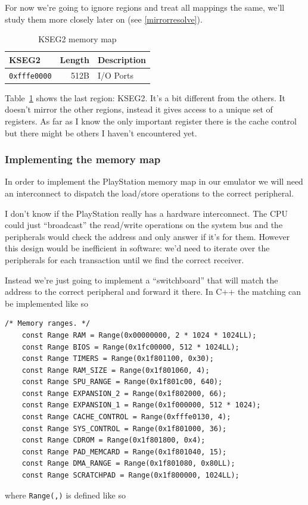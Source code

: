 \documentclass[a4paper]{article}
\newcommand{\code}[1] {\texttt{#1}}
\begin{document}
For now we're going to ignore regions and treat all mappings the same,
we'll study them more closely later on (see \ref{mirrorresolve}).

\begin{table}[ht]
  \centering

  \begin{tabular}{ l | r | l }
    KSEG2 & Length & Description \\
    \hline
    \code{0xfffe0000} & 512B & I/O Ports \\
  \end{tabular}

  \caption{KSEG2 memory map}
  \label{tab:kseg2}
\end{table}

Table~\ref{tab:kseg2} shows the last region: KSEG2. It's a bit
different from the others. It doesn't mirror the other regions,
instead it gives access to a unique set of registers. As far as I know
the only important register there is the cache control but there might
be others I haven't encountered yet.

\subsubsection{Implementing the memory map}

In order to implement the PlayStation memory map in our emulator we
will need an interconnect to dispatch the load/store operations to the
correct peripheral.

I don't know if the PlayStation really has a hardware
interconnect. The CPU could just ``broadcast'' the read/write operations
on the system bus and the peripherals would check the address and only
answer if it's for them. However this design would be inefficient in
software: we'd need to iterate over the peripherals for each
transaction until we find the correct receiver.

Instead we're just going to implement a ``switchboard'' that will match
the address to the correct peripheral and forward it there.  In C++ the
matching can be implemented like so

\begin{lstlisting}[caption={C++ code for memory range.}, label={code:memoryrangemap}]
	/* Memory ranges. */
	const Range RAM = Range(0x00000000, 2 * 1024 * 1024LL);
	const Range BIOS = Range(0x1fc00000, 512 * 1024LL);
	const Range TIMERS = Range(0x1f801100, 0x30);
	const Range RAM_SIZE = Range(0x1f801060, 4);
	const Range SPU_RANGE = Range(0x1f801c00, 640);
	const Range EXPANSION_2 = Range(0x1f802000, 66);
	const Range EXPANSION_1 = Range(0x1f000000, 512 * 1024);
	const Range CACHE_CONTROL = Range(0xfffe0130, 4);
	const Range SYS_CONTROL = Range(0x1f801000, 36);
	const Range CDROM = Range(0x1f801800, 0x4);
	const Range PAD_MEMCARD = Range(0x1f801040, 15);
	const Range DMA_RANGE = Range(0x1f801080, 0x80LL);
	const Range SCRATCHPAD = Range(0x1f800000, 1024LL);
\end{lstlisting}
where \code{Range(,)} is defined like so
      
\end{document}
